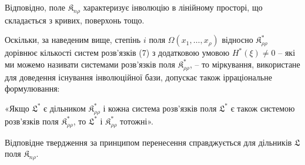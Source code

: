 \documentclass[11pt]{article}
\providecommand{\Kfield}{\mathfrak{K}}
\begin{document}
Відповідно, поле $\Kfield_{n\rho}$ характеризує інволюцію в лінійному просторі, що складається з кривих, поверхонь тощо.

Оскільки, за наведеним вище, степінь $i$ поля $\Omega(x_1,\ldots,x_\rho)$ відносно $\Kfield^*_{\rho\rho}$ дорівнює кількості систем розв'язків (7) з додатковою умовою $H^*(\xi)\ne0$ -- які ми можемо називати системами розв'язків поля $\Kfield^*_{\rho\rho}$, -- то міркування, використане для доведення існування інволюційної бази, допускає також ірраціональне формулювання:

«Якщо $\mathfrak{L}^*$ є дільником $\Kfield^*_{\rho\rho}$ і кожна система розв'язків поля $\mathfrak{L}^*$ є також системою розв'язків поля $\Kfield^*_{\rho\rho}$, то $\mathfrak{L}^*$ і $\Kfield^*_{\rho\rho}$ тотожні».

Відповідне твердження за принципом перенесення справджується для дільників $\mathfrak{L}$ поля $\Kfield_{n\rho}$.
\end{document}
